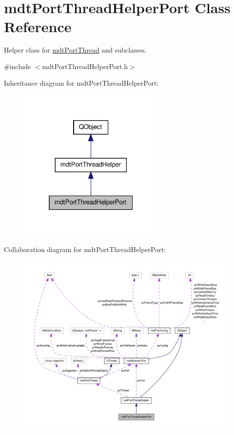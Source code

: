 \hypertarget{classmdt_port_thread_helper_port}{\section{mdt\-Port\-Thread\-Helper\-Port Class Reference}
\label{classmdt_port_thread_helper_port}
}


Helper class for \hyperlink{classmdt_port_thread}{mdt\-Port\-Thread} and subclasses.  




{\ttfamily \#include $<$mdt\-Port\-Thread\-Helper\-Port.\-h$>$}



Inheritance diagram for mdt\-Port\-Thread\-Helper\-Port\-:
\nopagebreak
\begin{figure}[H]
\begin{center}
\leavevmode
\includegraphics[width=208pt]{classmdt_port_thread_helper_port__inherit__graph}
\end{center}
\end{figure}


Collaboration diagram for mdt\-Port\-Thread\-Helper\-Port\-:
\nopagebreak
\begin{figure}[H]
\begin{center}
\leavevmode
\includegraphics[width=350pt]{classmdt_port_thread_helper_port__coll__graph}
\end{center}
\end{figure}
